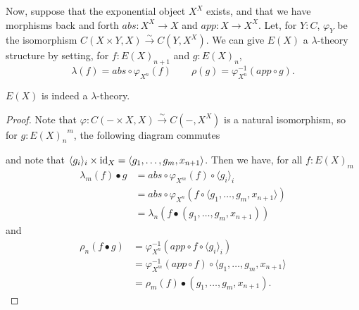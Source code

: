 \begin{definition}
  Now, suppose that the exponential object $ X^X $ exists, and that we have morphisms back and forth $ abs: X^X \to X $ and $ app: X \to X^X $. Let, for $ Y: C $, $ \varphi_Y $ be the isomorphism $ C(X \times Y, X) \xrightarrow{\sim} C(Y, X^X) $.
  We can give $ E(X) $ a $ \lambda $-theory structure by setting, for $ f: E(X)_{n + 1} $ and $ g: E(X)_n $,
  \[ \lambda(f) = abs \circ \varphi_{X^n}(f) \qquad \rho(g) = \varphi_{X^n}^{-1}(app \circ g). \]
\end{definition}

\begin{lemma}
  $ E(X) $ is indeed a $ \lambda $-theory.
\end{lemma}
\begin{proof}
  Note that $ \varphi: C(- \times X, X) \xrightarrow{\sim} C(-, X^X) $ is a natural isomorphism, so for $ g: {E(X)_n}^m $, the following diagram commutes
  \begin{center}
  \end{center}
  and note that $ \langle g_i \rangle_i \times \text{id}_{X} = \langle g_1, \dots, g_m, x_{n + 1} \rangle $. Then we have, for all $ f: E(X)_m $
  \begin{align*}
    \lambda_m(f) \bullet g &= abs \circ \varphi_{X^m}(f) \circ \langle g_i \rangle_i\\
    &= abs \circ \varphi_{X^n}(f \circ \langle g_1, \dots, g_m, x_{n + 1} \rangle)\\
    &= \lambda_n(f \bullet (g_1, \dots, g_m, x_{n + 1}))
  \end{align*}
  and
  \begin{align*}
    \rho_n(f \bullet g) &= \varphi_{X^n}^{-1}(app \circ f \circ \langle g_i \rangle_i)\\
    &= \varphi_{X^m}^{-1}(app \circ f) \circ \langle g_1, \dots, g_m, x_{n + 1} \rangle\\
    &= \rho_m(f) \bullet (g_1, \dots, g_m, x_{n + 1}).
  \end{align*}
\end{proof}

